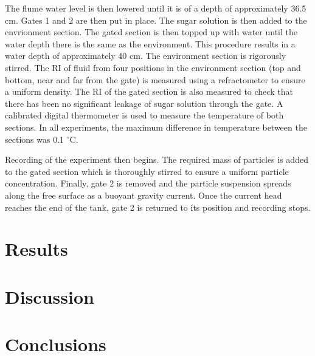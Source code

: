 \documentclass[authoryear,preprint,review,12pt]{elsarticle}
\begin{document}
The flume water level is then lowered until it is of a depth of approximately 36.5 cm. Gates 1 and 2 are then put in place. The sugar solution is then added to the envrionment section. The gated section is then topped up with water until the water depth there is the same as the environment. This procedure results in a water depth of approximately 40 cm. The environment section is rigorously stirred. The RI of fluid from four positions in the environment section (top and bottom, near and far from the gate) is measured using a refractometer to ensure a uniform density. The RI of the gated section is also measured to check that there has been no significant leakage of sugar solution through the gate. A calibrated digital thermometer is used to measure the temperature of both sections. In all experiments, the maximum difference in temperature between the sections was 0.1 $^{\circ}$C.

Recording of the experiment then begins. The required mass of particles is added to the gated section which is thoroughly stirred to ensure a uniform particle concentration. Finally, gate 2 is removed and the particle suspension spreads along the free surface as a buoyant gravity current. Once the current head reaches the end of the tank, gate 2 is returned to its position and recording stops. 
\section{Results}
\label{sec:res}

\section{Discussion}
\label{sec:dis}

\section{Conclusions}
\label{sec:conc}





\begin{thebibliography}{00}


\bibitem[ ()]{}

\end{thebibliography}
\end{document}
